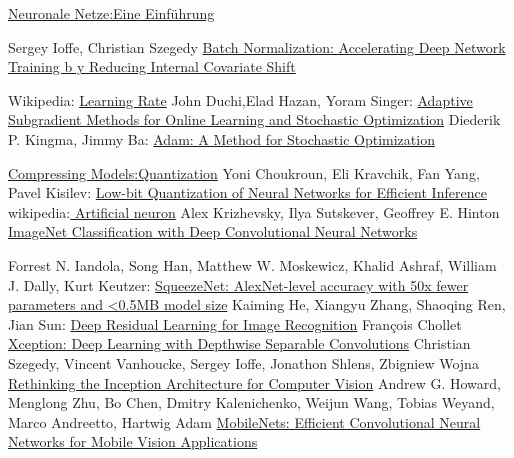 \documentclass[12pt,a4paper]{scrartcl}
\numberwithin{equation}{section}
\begin{document}
\begin{thebibliography}{lem00}
 	\href{http://www.neuronalesnetz.de/aktivitaet.html}{Neuronale Netze:Eine Einführung}
 	
	Sergey Ioffe, Christian Szegedy
 	\href{https://arxiv.org/pdf/1502.03167.pdf}{Batch Normalization: Accelerating Deep Network Training b
 		y
 		Reducing Internal Covariate Shift}

	Wikipedia:
		\href{https://en.wikipedia.org/wiki/Learning_rate}{Learning Rate}
		John Duchi,Elad Hazan, Yoram Singer:
		\href{http://www.jmlr.org/papers/volume12/duchi11a/duchi11a.pdf}{Adaptive Subgradient Methods for
			Online Learning and Stochastic Optimization}
		Diederik P. Kingma, Jimmy Ba:
		\href{https://arxiv.org/abs/1412.6980}{Adam: A Method for Stochastic Optimization}
		
		\href{https://nervanasystems.github.io/distiller/quantization.html}{Compressing Models:Quantization}
		Yoni Choukroun, Eli Kravchik, Fan Yang, Pavel Kisilev:
			\href{https://arxiv.org/abs/1902.06822}{Low-bit Quantization of Neural Networks for Efficient Inference}
	wikipedia:\href{https://en.wikipedia.org/wiki/Artificial_neuron}{ Artificial neuron}
	Alex Krizhevsky, Ilya Sutskever, Geoffrey E. Hinton
		\href{https://papers.nips.cc/paper/4824-imagenet-classification-with-deep-convolutional-neural-networks.pdf}{ImageNet Classification with Deep Convolutional Neural Networks}
  
  	Forrest N. Iandola, Song Han, Matthew W. Moskewicz, Khalid Ashraf, William J. Dally, Kurt Keutzer:
  	\href{https://arxiv.org/abs/1602.07360}{SqueezeNet: AlexNet-level accuracy with 50x fewer parameters and <0.5MB model size}
  		Kaiming He, Xiangyu Zhang, Shaoqing Ren, Jian Sun:
  		\href{https://arxiv.org/pdf/1512.03385.pdf}{Deep Residual Learning for Image Recognition}
  			François Chollet
  		\href{https://arxiv.org/abs/1610.02357}{Xception: Deep Learning with Depthwise Separable Convolutions}
 Christian Szegedy, Vincent Vanhoucke, Sergey Ioffe, Jonathon Shlens, Zbigniew Wojna
  			\href{https://arxiv.org/abs/1512.00567}{Rethinking the Inception Architecture for Computer Vision}
			Andrew G. Howard, Menglong Zhu, Bo Chen, Dmitry Kalenichenko, Weijun Wang, Tobias Weyand, Marco Andreetto, Hartwig Adam \href{https://arxiv.org/abs/1704.04861}{MobileNets: Efficient Convolutional Neural Networks for Mobile Vision Applications}
\end{thebibliography}

 
      

\newpage
  
 \thispagestyle{empty}


\vspace*{8cm}




\end{document}
